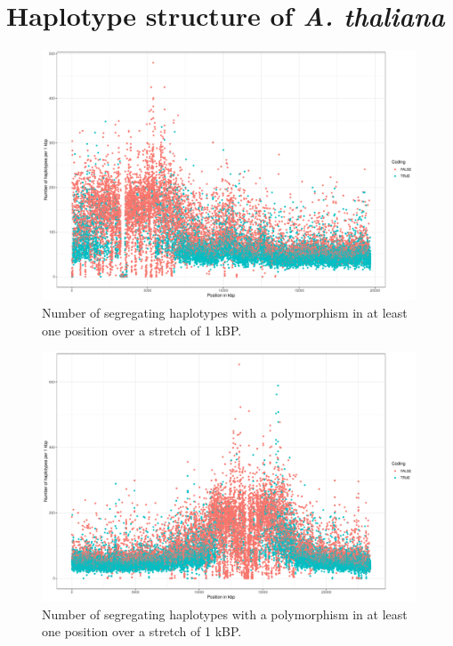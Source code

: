 \section{Haplotype structure of \textit{A. thaliana}} \label{haplo:str}


\begin{figure}[th]
\centering
\includegraphics[height=.55\textheight, width=0.99\textwidth]{Figures/chr2_hap}
\decoRule
\caption[Haplotype strutcture of chromosome 2 of \textit{A. thaliana}]{Number of segregating haplotypes with a polymorphism in at least one position over a stretch of 1 kBP. }
\label{fig:chr2}
\end{figure}


\begin{figure}[th]
\centering
\includegraphics[height=.55\textheight, width=0.99\textwidth]{Figures/chr3_hap}
\decoRule
\caption[Haplotype strutcture of chromosome 3 of \textit{A. thaliana}]{Number of segregating haplotypes with a polymorphism in at least one position over a stretch of 1 kBP. }
\label{fig:chr3}
\end{figure}


